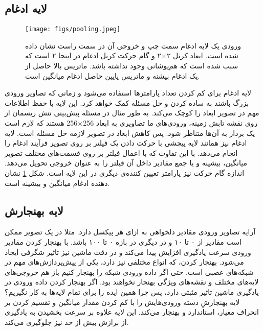 \subsection{لایه ادغام}
\begin{figure}[h!]
	\begin{center}
		\texttt{[image: figs/pooling.jpeg]}
	\end{center}
	\caption[
	ورودی یک لایه ادغام (نقشه ویژگی) سمت چپ و خروجی آن در سمت راست نشان داده شده است. ابعاد کرنل 
	۲$\times$۲
	و گام حرکت کرنل ادغام در اینجا ۲ است که سبب شده است که هم‌پوشانی وجود نداشته باشد. ماتریس بالا حاصل از یک ادغام بیشنه و ماتریس پایین حاصل ادغام میانگین است.]
	{
		ورودی یک لایه ادغام سمت چپ و خروجی آن در سمت راست نشان داده شده است. ابعاد کرنل 
		۲$\times$۲
		و گام حرکت کرنل ادغام در اینجا ۲ است که سبب شده است که هم‌پوشانی وجود نداشته باشد. ماتریس بالا حاصل از یک ادغام بیشنه و ماتریس پایین حاصل ادغام میانگین است.
		\footnotemark}
	\label{fig:pooling}
\end{figure}    
لایه ادغام برای کم کردن تعداد پارامترها استفاده می‌شود و زمانی که تصاویر ورودی بزرگ باشند به ساده کردن و حل مسئله کمک خواهد کرد. این لایه با حفظ اطلاعات مهم در تصویر ابعاد را کوچک می‌کند. به طور مثال در مسئله پیش‌بینی تنش ریسمان از روی نقشه تابش زمینه، ورودی‌های ما تصاویری به ابعاد 
256$\times$256
 هستند که لازم است یک بردار به آن‌ها متناظر شود. پس کاهش ابعاد در تصویر لازمه حل مسئله است. لایه ادغام نیز همانند لایه پیچشی با حرکت دادن یک فیلتر بر روی تصویر فرآیند ادغام را انجام می‌دهد. با این تفاوت که با اعمال فیلتر بر روی قسمت‌های مختلف تصویر میانگین، بیشینه و یا جمع مقادیر داخل آن فیلتر را به عنوان خروجی تحویل می‌دهد. اندازه گام حرکت نیز پارامتر تعیین کننده‌‌ی دیگری در این لایه است. شکل 
 \ref{fig:pooling}
 نشان دهنده ادغام میانگین و بیشینه است.

\subsection{لایه بهنجارش}
آرایه تصاویر ورودی مقادیر دلخواهی به ازای هر پیکسل دارد. مثلا در یک تصویر ممکن است مقادیر از ۰ تا ۱۰ و در دیگری در بازه ۰ تا ۱۰۰ باشد. با بهنجار کردن مقادیر ورودی سرعت یادگیری افزایش پیدا می‌کند و در دقت ماشین نیز تاثیر شگرفی ایجاد می‌شود. بهنجار کردن، که انواع مختلفی نیز دارد، یکی از پیش‌پردازش‌های مهم در شبکه‌های عصبی است. حتی اگر داده ورودی شبکه را بهنجار کنیم باز هم خروجی‌های لایه‌های مختلف و نقشه‌های ویژگی بهنجار نخواهند بود. اگر بهنجار کردن داده ورودی در یادگیری ماشین تاثیر مثبتی دارد، پس چرا همین ایده را برای تمام لایه‌ها به کار نگیریم؟ لایه بهنجارشِ دسته
ورودی‌هایش را با کم کردن مقدار میانگین و تقسیم کردن بر انحراف معیار، استاندارد و بهنجار می‌کند. این لایه علاوه بر سرعت بخشیدن به یادگیری از برازش بیش از حد نیز جلوگیری می‌کند.
\cite{ioffe2015batch}



